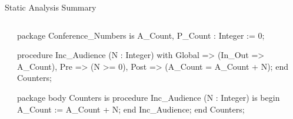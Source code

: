 \documentclass{beamer}
\begin{document}
\begin{frame}[fragile]{Static Analysis Summary}
  \begin{columns}
    \begin{column}{3cm}
      \begin{center}

      \end{center}
    \end{column}


    \begin{column}{9cm}

      \begin{pxcode}[language=SPARK,gobble=8]
        package Conference_Numbers
        is
           A_Count, P_Count : Integer := 0;

           procedure Inc_Audience (N : Integer)
           with Global => (In_Out => A_Count),
                Pre    => (N >= 0),
                Post   => (A_Count = A_Count + N);
        end Counters;

        package body Counters
        is
           procedure Inc_Audience (N : Integer)
           is
           begin
              A_Count := A_Count + N;
           end Inc_Audience;
        end Counters;
      \end{pxcode}

    \end{column}
  \end{columns}

\end{frame}
\end{document}
